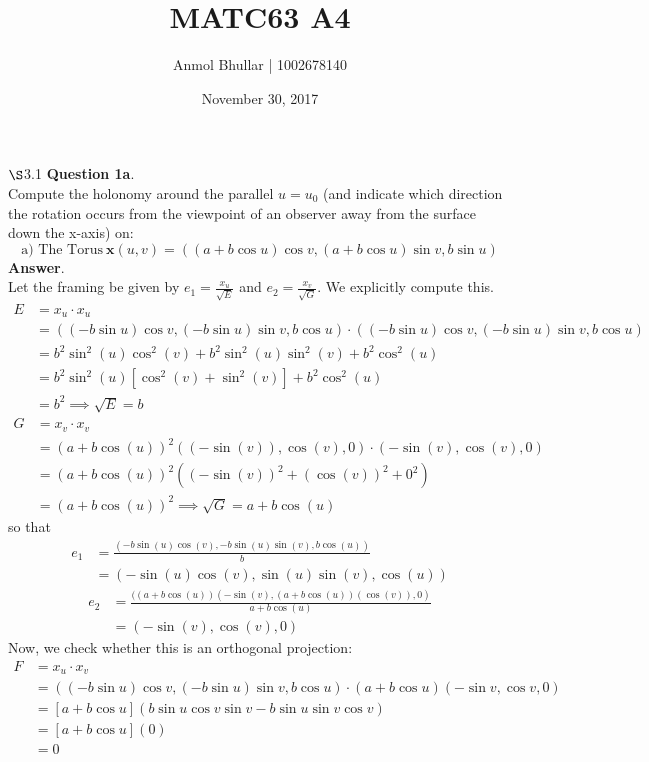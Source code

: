 \documentclass{article}
\title{MATC63 A4}
\date{November 30, 2017}
\author{Anmol Bhullar | 1002678140}
\begin{document}
    \maketitle 

    $\S$3.1 \textbf{Question 1a}.\\
    Compute the holonomy around the parallel $u=u_0$ (and indicate which direction the rotation occurs from the viewpoint of an observer away 
    from the surface down the x-axis) on:
    \[ \text{a) The Torus}\: \mathbf{x}(u,v) = ((a+b\cos{u})\cos{v},(a+b\cos{u})\sin{v},b\sin{u}) \]
    \textbf{Answer}.\\
    Let the framing be given by $e_1 = \frac{x_u}{\sqrt{E}}$ and $e_2 = \frac{x_v}{\sqrt{G}}$. We explicitly compute this.
    \begin{align*}
        E &= x_u\cdot x_u \\
        &= ((-b\sin{u})\cos{v},(-b\sin{u})\sin{v},b\cos{u}) \cdot ((-b\sin{u})\cos{v},(-b\sin{u})\sin{v},b\cos{u}) \\
        &= b^2\sin^2(u)\cos^2(v) + b^2\sin^2(u)\sin^2(v) + b^2\cos^2(u) \\
        &= b^2\sin^2(u)[\cos^2(v) + \sin^2(v)] + b^2\cos^2(u) \\
        &= b^2 \implies \sqrt{E} = b
    \end{align*}
    \begin{align*}
        G &= x_v\cdot x_v \\
        &= (a+b\cos(u))^2((-\sin(v)),\cos(v),0)\cdot(-\sin(v),\cos(v),0) \\
        &= (a+b\cos(u))^2((-\sin(v))^2 + (\cos(v))^2 + 0^2) \\
        &= (a+b\cos(u))^2 \implies \sqrt{G} = a+b\cos(u)
    \end{align*}
    so that
    \begin{align*}
        e_1 &= \frac{(-b\sin(u)\cos(v),-b\sin(u)\sin(v),b\cos(u))}{b} \\
        &= (-\sin(u)\cos(v),\sin(u)\sin(v),\cos(u))
    \end{align*}
    \begin{align*}
        e_2 &= \frac{((a+b\cos(u))(-\sin(v),(a+b\cos(u))(\cos(v)),0)}{a+b\cos(u)} \\
        &= (-\sin(v),\cos(v),0)
    \end{align*}
    Now, we check whether this is an orthogonal projection:
    \begin{align*}
        F &= x_u\cdot x_v \\
        &= ((-b\sin{u})\cos{v},(-b\sin{u})\sin{v},b\cos{u})\cdot (a+b\cos{u})(-\sin{v},\cos{v},0)\\
        &= [a+b\cos{u}](b\sin{u}\cos{v}\sin{v} - b\sin{u}\sin{v}\cos{v})\\
        &= [a+b\cos{u}](0)\\
        &= 0
    \end{align*}
\end{document}
